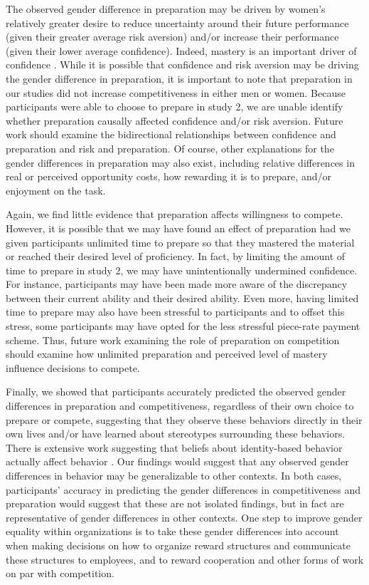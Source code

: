\documentclass[a4paper, nobind]{templates/ociamthesis}
\begin{document}
The observed gender difference in preparation may be driven by women's relatively greater desire to reduce uncertainty around their future performance (given their greater average risk aversion) and/or increase their performance (given their lower average confidence). Indeed, mastery is an important driver of confidence \autocites[for review, see][]{Gist1992,Usher2008}. While it is possible that confidence and risk aversion may be driving the gender difference in preparation, it is important to note that preparation in our studies did not increase competitiveness in either men or women. Because participants were able to choose to prepare in study 2, we are unable identify whether preparation causally affected confidence and/or risk aversion. Future work should examine the bidirectional relationships between confidence and preparation and risk and preparation. Of course, other explanations for the gender differences in preparation may also exist, including relative differences in real or perceived opportunity costs, how rewarding it is to prepare, and/or enjoyment on the task.

Again, we find little evidence that preparation affects willingness to compete. However, it is possible that we may have found an effect of preparation had we given participants unlimited time to prepare so that they mastered the material or reached their desired level of proficiency. In fact, by limiting the amount of time to prepare in study 2, we may have unintentionally undermined confidence. For instance, participants may have been made more aware of the discrepancy between their current ability and their desired ability. Even more, having limited time to prepare may also have been stressful to participants and to offset this stress, some participants may have opted for the less stressful piece-rate payment scheme. Thus, future work examining the role of preparation on competition should examine how unlimited preparation and perceived level of mastery influence decisions to compete.

Finally, we showed that participants accurately predicted the observed gender differences in preparation and competitiveness, regardless of their own choice to prepare or compete, suggesting that they observe these behaviors directly in their own lives and/or have learned about stereotypes surrounding these behaviors. There is extensive work suggesting that beliefs about identity-based behavior actually affect behavior \autocite{Babcock2012,Bowles2007,Toosi2019,Smith2014,Benjamin2010c,Bertrand2015,Akerlof2000}. Our findings would suggest that any observed gender differences in behavior may be generalizable to other contexts. In both cases, participants' accuracy in predicting the gender differences in competitiveness and preparation would suggest that these are not isolated findings, but in fact are representative of gender differences in other contexts. One step to improve gender equality within organizations is to take these gender differences into account when making decisions on how to organize reward structures and communicate these structures to employees, and to reward cooperation and other forms of work on par with competition.
\end{document}
